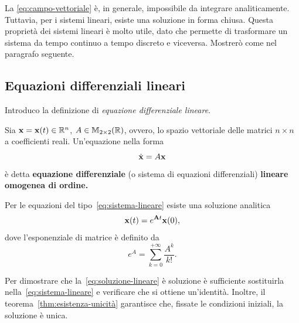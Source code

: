 La \eqref{eq:campo-vettoriale} è, in generale, impossibile da integrare analiticamente.
Tuttavia, per i sistemi lineari, esiste una soluzione in forma chiusa.
Questa proprietà dei sistemi lineari è molto utile, dato che permette di trasformare un sistema
da tempo continuo a tempo discreto e viceversa.
Mostrerò come nel paragrafo seguente.


\subsection{Equazioni differenziali lineari}
\label{subsec:equazioni-differenziali-lineari}
Introduco la definizione di \emph{equazione differenziale lineare}.
\begin{definition}
    Sia $\mathbf{x} = \mathbf{x}(t) \in \mathbb{R}^n$, $A \in \mathbb{M}_{2\times 2}(\mathbb{R})$, ovvero, lo spazio vettoriale delle
    matrici $n \times n$ a coefficienti reali. Un'equazione nella forma
    \begin{equation}
        \dot{\mathbf{x}} = A \mathbf{x}
        \label{eq:sistema-lineare}
    \end{equation}
    è detta \textbf{equazione differenziale} (o sistema di equazioni differenziali) \textbf{lineare omogenea di  ordine.}
    \label{def:sistema-lineare}
\end{definition}

Per le equazioni del tipo~\eqref{eq:sistema-lineare} esiste una soluzione analitica
\begin{equation}
    \mathbf{x}(t) = e^{\mathbf{A} t} \mathbf{x}(0),
    \label{eq:soluzione-lineare}
\end{equation}
dove l'esponenziale di matrice è definito da
\begin{equation*}
    e^{A} = \sum_{k=0}^{+\infty} \frac{A^k}{k!}.
\end{equation*}

Per dimostrare che la~\eqref{eq:soluzione-lineare} è soluzione è
sufficiente sostituirla nella~\eqref{eq:sistema-lineare} e verificare che
si ottiene un'identità.
Inoltre, il teorema~\ref{thm:esistenza-unicità} garantisce che,
fissate le condizioni iniziali, la
soluzione è unica.

